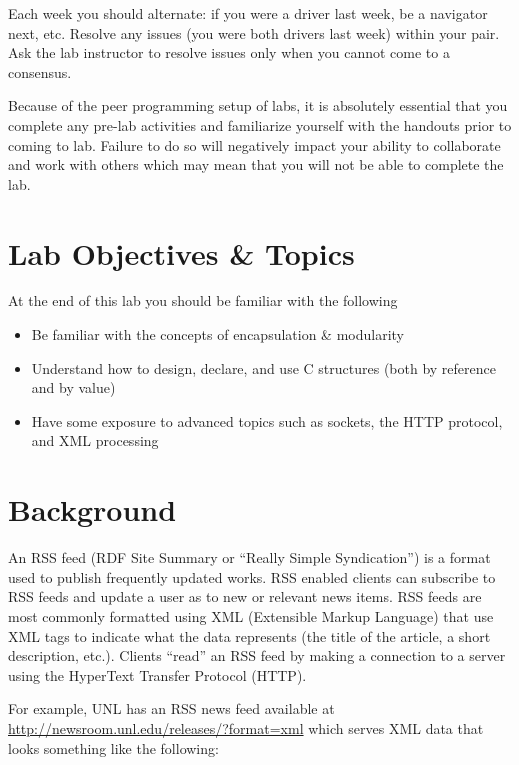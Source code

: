 \documentclass[12pt]{scrartcl}
\begin{document}
Each week you should alternate: if you were a driver last week, 
be a navigator next, etc.  Resolve any issues (you were both drivers
last week) within your pair.  Ask the lab instructor to resolve issues
only when you cannot come to a consensus.  

Because of the peer programming setup of labs, it is absolutely 
essential that you complete any pre-lab activities and familiarize
yourself with the handouts prior to coming to lab.  Failure to do
so will negatively impact your ability to collaborate and work with 
others which may mean that you will not be able to complete the
lab.  

\section{Lab Objectives \& Topics}
At the end of this lab you should be familiar with the following
\begin{itemize}
  \item Be familiar with the concepts of encapsulation \& modularity
  \item Understand how to design, declare, and use C structures 
  	(both by reference and by value)
  \item Have some exposure to advanced topics such as sockets, 
	the HTTP protocol, and XML processing
\end{itemize}

\section{Background}

An RSS feed (RDF Site Summary or ``Really Simple Syndication'') 
is a format used to publish frequently updated works.  RSS enabled 
clients can subscribe to RSS feeds and update a user as to new or 
relevant news items.  RSS feeds are most commonly formatted using 
XML (Extensible Markup Language) that use XML tags to indicate 
what the data represents (the title of the article, a short description, 
etc.).  Clients ``read'' an RSS feed by making a connection to a server 
using the HyperText Transfer Protocol (HTTP).

For example, UNL has an RSS news feed available at \url{http://newsroom.unl.edu/releases/?format=xml} 
which serves XML data that looks something like the following:
\end{document}
